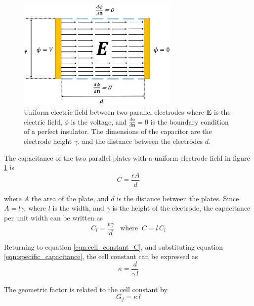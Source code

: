    \begin{figure}[ht]
  \centering
  \includegraphics[width=0.7\textwidth]{images/capacitorNoFringe.png}
  \caption[Uniform electric field between parallel plates]{Uniform electric field between two parallel electrodes where $\boldsymbol{E}$ is the electric field, $\phi$ is the voltage, and $\frac{d\phi}{d\boldsymbol{n}}=0$ is the boundary condition of a perfect insulator. The dimensions of the capacitor are the electrode height $\gamma$, and the distance between the electrodes $d$.}
  \label{fig:parallel_capacitor}
  \end{figure}
  
  \par The capacitance of the two parallel plates with a uniform electrode field in figure \ref{fig:parallel_capacitor} is
  \begin{equation}
      C = \frac{\epsilon A}{d}
      \label{eqn:capacitor}
  \end{equation}
  
  \noindent where $A$ the area of the plate, and $d$ is the distance between the plates. Since $A = l\gamma$, where $l$ is the width, and $\gamma$ is the height of the electrode, the capacitance per unit width can be written as
  \begin{equation}
      C_l = \frac{\epsilon\gamma}{d} \;\;\;\text{where} \;\; C =l\, C_l
      \label{eqn:specific_capacitance}
  \end{equation}
  
  \par Returning to equation \ref{eqn:cell_constant_C}, and substituting equation \ref{eqn:specific_capacitance}, the cell constant can be expressed as 
  \begin{equation}
      \kappa = \frac{d}{\gamma \, l}
      \label{eqn:cell_constant}
  \end{equation}
  
  \noindent The geometric factor is related to the cell constant by 
  \begin{equation}
       G_f = \kappa \,l
       \label{geometric_cell}
  \end{equation}

